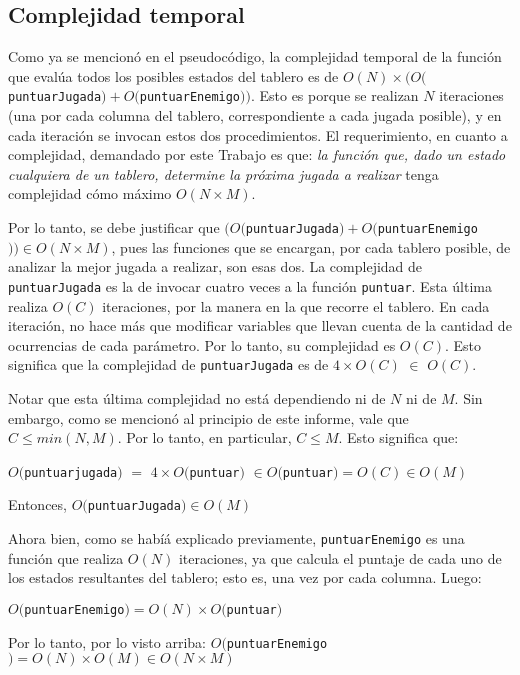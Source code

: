 \documentclass[12pt,a4paper]{article}
\begin{document}
    
    \subsection{Complejidad temporal}
    
    Como ya se mencionó en el pseudocódigo, la complejidad temporal de la función que evalúa todos los posibles estados del tablero es de $O(N) \times (O($\texttt{puntuarJugada}$) + O($\texttt{puntuarEnemigo}$))$. Esto es porque se realizan $N$ iteraciones (una por cada columna del tablero, correspondiente a cada jugada posible), y en cada iteración se invocan estos dos procedimientos. El requerimiento, en cuanto a complejidad, demandado por este Trabajo es que: \textit{la función que, dado un estado cualquiera de un tablero, determine la próxima jugada a realizar} tenga complejidad cómo máximo $O(N \times M)$. 
    
    Por lo tanto, se debe justificar que $(O($\texttt{puntuarJugada}$) + O($\texttt{puntuarEnemigo}$)) \in O(N \times M)$, pues las funciones que se encargan, por cada tablero posible, de analizar la mejor jugada a realizar, son esas dos. La complejidad de \texttt{puntuarJugada} es la de invocar cuatro veces a la función \texttt{puntuar}. Esta última realiza $O(C)$ iteraciones, por la manera en la que recorre el tablero. En cada iteración, no hace más que modificar variables que llevan cuenta de la cantidad de ocurrencias de cada parámetro. Por lo tanto, su complejidad es $O(C)$. Esto significa que la complejidad de \texttt{puntuarJugada} es de $4\times O(C)$ $\in$ $O(C)$.
    
    Notar que esta última complejidad no está dependiendo ni de $N$ ni de $M$. Sin embargo, como se mencionó al principio de este informe, vale que $C \leq min(N, M)$. Por lo tanto, en particular, $C \leq M$. Esto significa que:
    
    \begin{center}
        $O($\texttt{puntuarjugada}$)$ $=$ $4 \times O($\texttt{puntuar}$)$ $\in O($\texttt{puntuar}$) = O(C) \in O(M)$
        
        Entonces, $O($\texttt{puntuarJugada}$) \in O(M)$
    \end{center}
    
    Ahora bien, como se habíá explicado previamente, \texttt{puntuarEnemigo} es una función que realiza $O(N)$ iteraciones, ya que calcula el puntaje de cada uno de los estados resultantes del tablero; esto es, una vez por cada columna. Luego:
    
    \begin{center}
        $O($\texttt{puntuarEnemigo}$) = O(N) \times O($\texttt{puntuar}$)$
        
        Por lo tanto, por lo visto arriba: $O($\texttt{puntuarEnemigo}$) = O(N) \times O(M) \in O(N \times M)$
    \end{center}
    
\end{document}
